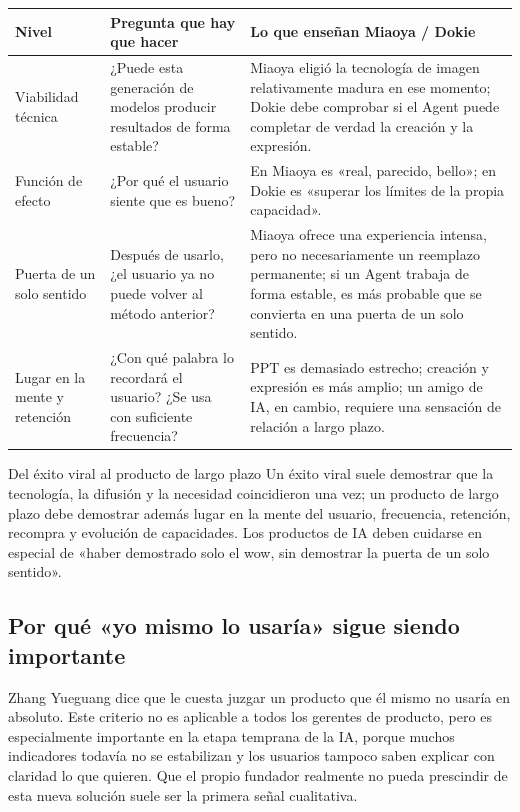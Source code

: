 \documentclass[a4paper]{article}
\begin{document}
\begin{longtable}{p{}p{}p{}}
\toprule
Nivel & Pregunta que hay que hacer & Lo que enseñan Miaoya / Dokie \\
\midrule
Viabilidad técnica & ¿Puede esta generación de modelos producir resultados de forma estable? & Miaoya eligió la tecnología de imagen relativamente madura en ese momento; Dokie debe comprobar si el Agent puede completar de verdad la creación y la expresión. \\
Función de efecto & ¿Por qué el usuario siente que es bueno? & En Miaoya es «real, parecido, bello»; en Dokie es «superar los límites de la propia capacidad». \\
Puerta de un solo sentido & Después de usarlo, ¿el usuario ya no puede volver al método anterior? & Miaoya ofrece una experiencia intensa, pero no necesariamente un reemplazo permanente; si un Agent trabaja de forma estable, es más probable que se convierta en una puerta de un solo sentido. \\
Lugar en la mente y retención & ¿Con qué palabra lo recordará el usuario? ¿Se usa con suficiente frecuencia? & PPT es demasiado estrecho; creación y expresión es más amplio; un amigo de IA, en cambio, requiere una sensación de relación a largo plazo. \\
\bottomrule
\end{longtable}

\begin{importantbox}{Del éxito viral al producto de largo plazo}
Un éxito viral suele demostrar que la tecnología, la difusión y la necesidad coincidieron una vez; un producto de largo plazo debe demostrar además lugar en la mente del usuario, frecuencia, retención, recompra y evolución de capacidades. Los productos de IA deben cuidarse en especial de «haber demostrado solo el wow, sin demostrar la puerta de un solo sentido».
\end{importantbox}

\subsection{Por qué «yo mismo lo usaría» sigue siendo importante}

Zhang Yueguang dice que le cuesta juzgar un producto que él mismo no usaría en absoluto. Este criterio no es aplicable a todos los gerentes de producto, pero es especialmente importante en la etapa temprana de la IA, porque muchos indicadores todavía no se estabilizan y los usuarios tampoco saben explicar con claridad lo que quieren. Que el propio fundador realmente no pueda prescindir de esta nueva solución suele ser la primera señal cualitativa.
\end{document}
